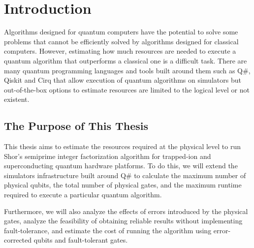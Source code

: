 %
%
\chapter {Introduction}

Algorithms designed for quantum computers have the potential to solve some problems that cannot be efficiently solved by algorithms designed for classical computers. However, estimating how much resources are needed to execute a quantum algorithm that outperforms a classical one is a difficult task. There are many quantum programming languages and tools built around them such as Q\#\cite{QSharp_Svore_2018}, Qiskit\cite{Qiskit_2021} and Cirq\cite{Cirq_2021} that allow execution of quantum algorithms on simulators but out-of-the-box options to estimate resources are limited to the logical level or not existent.

\section{The Purpose of This Thesis}

This thesis aims to estimate the resources required at the physical level to run Shor's semiprime integer factorization algorithm for trapped-ion and superconducting quantum hardware platforms. To do this, we will extend the simulators infrastructure built around Q\# to calculate the maximum number of physical qubits, the total number of physical gates, and the maximum runtime required to execute a particular quantum algorithm. 

Furthermore, we will also analyze the effects of errors introduced by the physical gates, analyze the feasibility of obtaining reliable results without implementing fault-tolerance, and estimate the cost of running the algorithm using error-corrected qubits and fault-tolerant gates.
